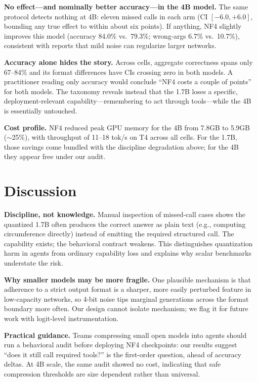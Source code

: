 \documentclass{article}
\begin{document}
\textbf{No effect---and nominally better accuracy---in the 4B model.}
The same protocol detects nothing at 4B: eleven missed calls in each arm
(CI $[-6.0,+6.0]$, bounding any true effect to within about six points).
If anything, NF4 slightly improves this model (accuracy 84.0\% vs.\ 79.3\%;
wrong-args 6.7\% vs.\ 10.7\%), consistent with reports that mild noise can
regularize larger networks.

\textbf{Accuracy alone hides the story.}
Across cells, aggregate correctness spans only 67--84\% and its format
differences have CIs crossing zero in both models. A practitioner reading
only accuracy would conclude ``NF4 costs a couple of points'' for both
models. The taxonomy reveals instead that the 1.7B loses a specific,
deployment-relevant capability---remembering to act through tools---while
the 4B is essentially untouched.

\textbf{Cost profile.} NF4 reduced peak GPU memory for the 4B from 7.8GB to
5.9GB ($\sim$25\%), with throughput of 11--18 tok/s on T4 across all cells.
For the 1.7B, those savings come bundled with the discipline degradation
above; for the 4B they appear free under our audit.

\section{Discussion}
\label{sec:discussion}

\textbf{Discipline, not knowledge.} Manual inspection of missed-call cases
shows the quantized 1.7B often produces the correct answer as plain text
(e.g., computing circumference directly) instead of emitting the required
structured call. The capability exists; the behavioral contract weakens.
This distinguishes quantization harm in agents from ordinary capability
loss and explains why scalar benchmarks understate the risk.

\textbf{Why smaller models may be more fragile.} One plausible mechanism is
that adherence to a strict output format is a sharper, more easily perturbed
feature in low-capacity networks, so 4-bit noise tips marginal generations
across the format boundary more often. Our design cannot isolate mechanism;
we flag it for future work with logit-level instrumentation.

\textbf{Practical guidance.} Teams compressing small open models into agents
should run a behavioral audit before deploying NF4 checkpoints: our results
suggest ``does it still call required tools?'' is the first-order question,
ahead of accuracy deltas. At 4B scale, the same audit showed no cost,
indicating that safe compression thresholds are size dependent rather than
universal.
\end{document}
